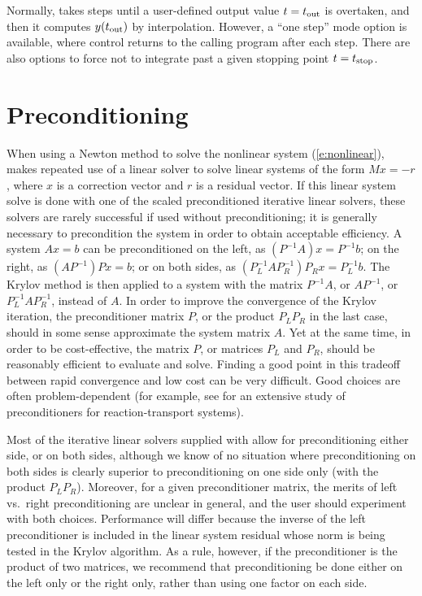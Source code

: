 Normally, {\cvodes} takes steps until a user-defined output value 
$t = t_{\mbox{\scriptsize out}}$ is overtaken, and then it computes
$y(t_{\mbox{\scriptsize out}})$ by interpolation.  However, a
``one step'' mode option is available, where control returns to the
calling program after each step.  There are also options to force
{\cvodes} not to integrate past a given stopping point 
$t = t_{\mbox{\scriptsize stop}}$.

\section{Preconditioning}\label{s:preconditioning}
When using a Newton method to solve the nonlinear system (\ref{e:nonlinear}),
{\cvodes} makes repeated use of a linear solver to solve linear systems of the form
$M x = - r$, where $x$ is a correction vector and $r$ is a residual vector.
If this linear system solve is done with one of the scaled preconditioned iterative 
linear solvers, these solvers are rarely successful if used without preconditioning;
it is generally necessary to precondition the system in order to obtain acceptable efficiency.  
A system $A x = b$ can be preconditioned on the left, as $(P^{-1}A) x = P^{-1} b$;
on the right, as $(A P^{-1}) P x = b$; or on both sides, as
$(P_L^{-1} A P_R^{-1}) P_R x = P_L^{-1}b$.  The Krylov method is then
applied to a system with the matrix $P^{-1}A$, or $AP^{-1}$, or
$P_L^{-1} A P_R^{-1}$, instead of $A$.  In order to improve the
convergence of the Krylov iteration, the preconditioner matrix $P$, or
the product $P_L P_R$ in the last case, should in some sense
approximate the system matrix $A$.  Yet at the same time, in order to
be cost-effective, the matrix $P$, or matrices $P_L$ and $P_R$, should
be reasonably efficient to evaluate and solve.  Finding a good point
in this tradeoff between rapid convergence and low cost can be very
difficult.  Good choices are often problem-dependent (for example, see
\cite{BrHi:89} for an extensive study of preconditioners for
reaction-transport systems).

Most of the iterative linear solvers supplied with {\sundials} allow
for preconditioning either side, or on both sides, although we know of
no situation where preconditioning on both sides is clearly superior to
preconditioning on one side only (with the product $P_L P_R$).
Moreover, for a given preconditioner matrix, the merits of left vs.~right
preconditioning are unclear in general, and the user should experiment
with both choices.  Performance will differ because the inverse of the
left preconditioner is included in the linear system residual whose
norm is being tested in the Krylov algorithm.  As a rule, however, if
the preconditioner is the product of two matrices, we recommend that
preconditioning be done either on the left only or the right only,
rather than using one factor on each side. 

